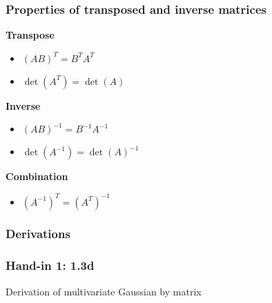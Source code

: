 \subsubsection{Properties of transposed and inverse matrices}
\textbf{Transpose}
\begin{itemize}
	\item $(AB)^T=B^T A^T$
	\item $\det\left(A^{T}\right) = \det\left(A\right)$
\end{itemize}
\textbf{Inverse}
\begin{itemize}
	\item $(AB)^{-1} = B^{-1} A^{-1}$
	\item $\det\left(A^{-1}\right) = \det\left(A\right)^{-1}$
\end{itemize}
\textbf{Combination}
\begin{itemize}
	\item $\left(A^{-1}\right)^T = \left(A^{T}\right)^{-1}$
\end{itemize}
\subsubsection{Derivations}
\subsubsection{Hand-in 1: 1.3d}
Derivation of multivariate Gaussian by matrix
